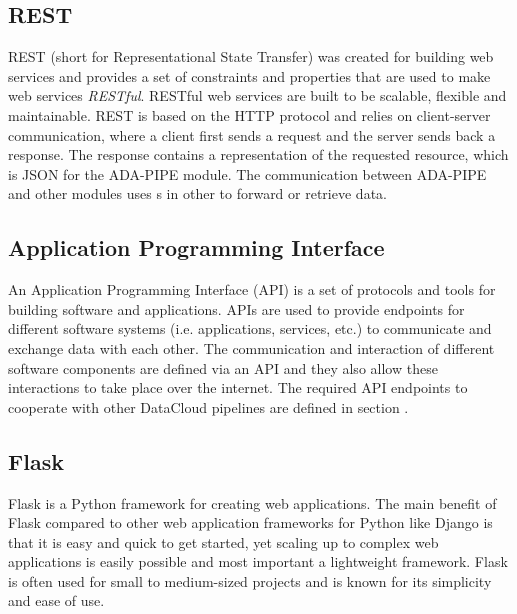 \documentclass{article}
\begin{document}
        \subsection{REST}
        \label{sec:rest-server}

            REST \cite{redhatWhatRESTAPI} (short for Representational State Transfer) was created for building web services and provides a set of constraints and properties
            that are used to make web services \emph{RESTful}. RESTful web services are built to be scalable, flexible and maintainable.
            REST is based on the HTTP protocol and relies on client-server communication, where a client first sends a request and the server sends back a response.
            The response contains a representation of the requested resource, which is JSON for the ADA-PIPE module.
            The communication between ADA-PIPE and other modules uses s in other to forward or retrieve data.

        \subsection{Application Programming Interface}
        \label{sec:api-server}

            An Application Programming Interface (API) \cite{redhatWhatRESTAPI} is a set of protocols and tools for building software and applications.
            APIs are used to provide endpoints for different software systems (i.e. applications, services, etc.) to communicate and exchange data with each other.
            The communication and interaction of different software components are defined via an API and they also allow these interactions to take place over the internet.
            The required API endpoints to cooperate with other DataCloud pipelines are defined in section .

        \subsection{Flask}
        \label{sec:flask-server}

            Flask \cite{WelcomeFlaskFlask} is a Python framework for creating web applications.
            The main benefit of Flask compared to other web application frameworks for Python like Django is that it is easy and quick to get started, yet scaling up to complex web applications is easily possible and most important a lightweight framework.
            Flask is often used for small to medium-sized projects and is known for its simplicity and ease of use.
\end{document}
